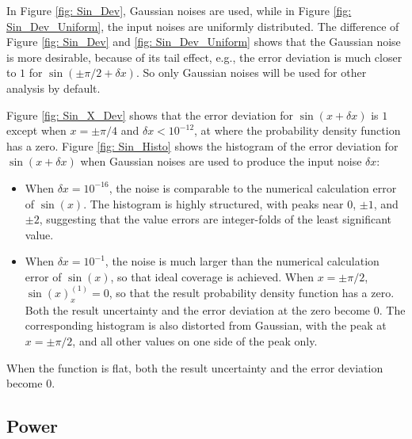 \documentclass[twoside]{article}
\numberwithin{equation}{section}
\begin{document}
In Figure \ref{fig: Sin_Dev}, Gaussian noises are used, while in Figure \ref{fig: Sin_Dev_Uniform}, the input noises are uniformly distributed.
The difference of Figure \ref{fig: Sin_Dev} and \ref{fig: Sin_Dev_Uniform} shows that the Gaussian noise is more desirable, because of its tail effect, e.g., the error deviation is much closer to $1$ for $\sin(\pm \pi/2 + \delta x)$.
So only Gaussian noises will be used for other analysis by default.

Figure \ref{fig: Sin_X_Dev} shows that the error deviation for $\sin(x + \delta x)$ is $1$ except when $x=\pm \pi/4$ and $\delta x < 10^{-12}$, at where the probability density function has a zero.
Figure \ref{fig: Sin_Histo} shows the histogram of the error deviation for $\sin(x + \delta x)$ when Gaussian noises are used to produce the input noise $\delta x$:
\begin{itemize}
\item When $\delta x=10^{-16}$, the noise is comparable to the numerical calculation error of $\sin(x)$.
The histogram is highly structured, with peaks near $0$, $\pm 1$, and $\pm 2$, suggesting that the value errors are integer-folds of the least significant value.

\item When $\delta x=10^{-1}$, the noise is much larger than the numerical calculation error of $\sin(x)$, so that ideal coverage is achieved.
When $x=\pm \pi/2$, $\sin(x)^{(1)}_{x} = 0$, so that the result probability density function has a zero.
Both the result uncertainty and the error deviation at the zero become $0$.
The  corresponding histogram is also distorted from Gaussian, with the peak at $x=\pm \pi/2$, and all other values on one side of the peak only.

\end{itemize}
When the function is flat, both the result uncertainty and the error deviation become $0$.


\subsection{Power}
\end{document}
